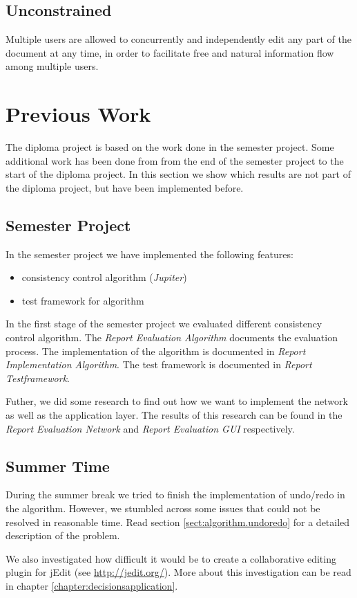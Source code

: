 \subsection{Unconstrained} 
Multiple users are allowed to concurrently and
independently edit any part of the document at any time, in order to 
facilitate free and natural information flow among multiple users.



\section{Previous Work}
\label{sect:overview.previouswork}

The diploma project is based on the work done in the semester project. Some
additional work has been done from from the end of the semester
project to the start of the diploma project. In this section we show which
results are not part of the diploma project, but have been implemented
before.

\subsection{Semester Project}
In the semester project we have implemented the following features:
\begin{itemize}
 \item consistency control algorithm (\emph{Jupiter})
 \item test framework for algorithm
\end{itemize}

In the first stage of the semester project we evaluated different
consistency control algorithm. The \emph{Report Evaluation Algorithm}
documents the evaluation process. The implementation of the
algorithm is documented in \emph{Report Implementation Algorithm}. The
test framework is documented in \emph{Report Testframework}.

Futher, we did some research to find out how we want to implement the
network as well as the application layer. The results of this research
can be found in the \emph{Report Evaluation Network} and 
\emph{Report Evaluation GUI} respectively.


\subsection{Summer Time}
During the summer break we tried to finish the implementation of undo/redo
in the algorithm. However, we stumbled across some issues that could not
be resolved in reasonable time. Read section \ref{sect:algorithm.undoredo} for
a detailed description of the problem.

We also investigated how difficult it would be to create a collaborative 
editing plugin for jEdit (see \href{http://jedit.org/}{http://jedit.org/}).
More about this investigation can be read in chapter 
\ref{chapter:decisionsapplication}.

